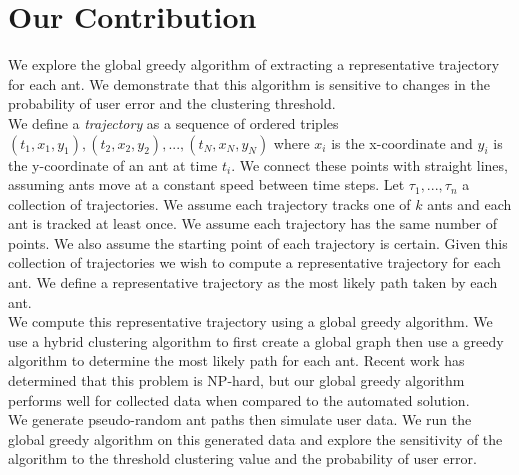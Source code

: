 \documentclass[12pt]{article}
\begin{document}
\section{Our Contribution}
We explore the global greedy algorithm of extracting a representative trajectory for each ant. We demonstrate that this algorithm is sensitive to changes in the probability of user error and the clustering threshold. \\
We define a {\it trajectory} as a sequence of ordered triples $(t_1, x_1, y_1), (t_2, x_2, y_2),..., (t_N, x_N, y_N)$ where $x_i$ is the x-coordinate and $y_i$ is the y-coordinate of an ant at time $t_i$. We connect these points with straight lines, assuming ants move at a constant speed between time steps. Let $\tau_1,...,\tau_n$ a collection of trajectories. We assume each trajectory tracks one of $k$ ants and each ant is tracked at least once. We assume each trajectory has the same number of points. We also assume the starting point of each trajectory is certain. Given this collection of trajectories we wish to compute a representative trajectory for each ant. We define a representative trajectory as the most likely path taken by each ant. \\
We compute this representative trajectory using a global greedy algorithm. We use a hybrid clustering algorithm to first create a global graph then use a greedy algorithm to determine the most likely path for each ant. Recent work has determined that this problem is NP-hard, but our global greedy algorithm performs well for collected data when compared to the automated solution. \\
We generate pseudo-random ant paths then simulate user data. We run the global greedy algorithm on this generated data and explore the sensitivity of the algorithm to the threshold clustering value and the probability of user error. 
\end{document}

